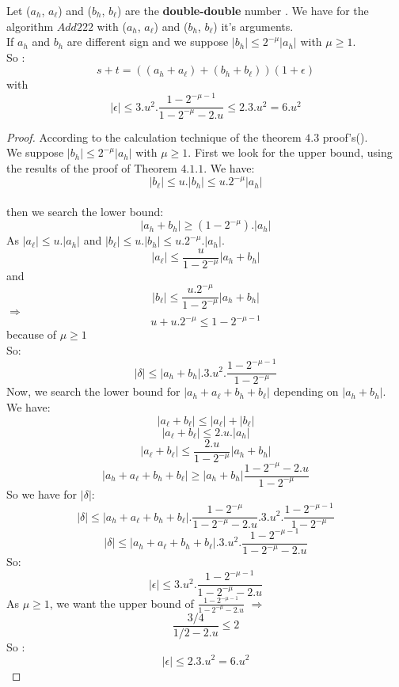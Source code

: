 \begin{theo}
Let ($a_h$, $a_{\ell}$) and ($b_h$, $b_{\ell}$) are the \textbf{double-double} number . We have for the algorithm $Add222$ with
($a_h$, $a_{\ell}$) and ($b_h$, $b_{\ell}$) it's arguments.\\
If $a_h$ and $b_h$ are different sign and we suppose $\lvert b_h \rvert \le 2^{-\mu} \lvert a_h \rvert $ with $\mu \ge 1$.\\
So :
$$ s+t = ((a_h+a_{\ell}) + (b_h + b_{\ell}))(1+\epsilon)$$
with $$\lvert \epsilon \rvert \le 3.u^2. \frac{1-2^{-\mu -1}}{1 - 2^{-\mu} - 2.u} \le 2.3.u^2 = 6.u^2$$
\end{theo}

\begin{proof} \color{-yellow}
According to the calculation technique of the theorem $4.3$ proof's(\cite{lauter2005basic}).\\
We suppose $\lvert b_h \rvert \le 2^{-\mu} \lvert a_h \rvert$ with $\mu \ge 1$.
First we look for the upper bound, using the results of the proof of Theorem $4.1.1$. We have:\\
$$\lvert b_{\ell} \rvert \le u.\lvert b_h \rvert \le u.2^{- \mu}\lvert a_h \rvert $$\\
then we search the lower bound:\\
$$\lvert a_h + b_h \rvert \ge (1 -2^{- \mu}).\lvert a_h\rvert$$
As $\lvert a_{\ell} \rvert \le u. \lvert a_h \rvert$ and $\lvert b_{\ell} \rvert \le u. \lvert b_h \rvert \le u.2^{-\mu}. \lvert a_h \rvert$.
$$\lvert a_{\ell}  \rvert \le \frac{u}{1- 2^{-\mu}}\lvert a_h + b_h\rvert$$
and 
$$\lvert b_{\ell}  \rvert \le \frac{u.2^{- \mu}}{1- 2^{-\mu}}\lvert a_h + b_h\rvert$$
$\Rightarrow$ 
$$u+u.2^{- \mu}\le 1 - 2^{-\mu -1}$$ because of $\mu \ge 1$\\
So:
$$ \lvert \delta \rvert \le \lvert a_h + b_h \rvert .3.u^2 .\frac{1 - 2^{-\mu -1}}{1 - 2^{-\mu}} $$
Now, we search the lower bound for $\lvert a_h +a_{\ell} + b_h +b_{\ell} \rvert $ depending on $\lvert a_h + b_h \rvert$.\\
We have:
$$\lvert a_{\ell} + b_{\ell} \rvert \le \lvert a_{\ell} \rvert + \lvert b_{\ell} \rvert$$
$$\lvert a_{\ell} + b_{\ell} \rvert \le 2.u.\lvert a_h \rvert$$
$$\lvert a_{\ell} + b_{\ell} \rvert \le \frac{2.u}{1 - 2^{-\mu}}\lvert a_h + b_h \rvert$$
$$\lvert a_h +a_{\ell} + b_h +b_{\ell} \rvert \ge  \lvert a_h + b_h \rvert \frac{1 - 2^{-\mu} -2.u}{1 - 2^{-\mu}}$$
So we have for $\lvert \delta \rvert $:
$$ \lvert \delta \rvert \le \lvert a_h + a_{\ell} + b_h + b_{\ell} \rvert. \frac{1 - 2^{-\mu}}{1 - 2^{-\mu} -2.u} .3.u^2 .\frac{1 - 2^{-\mu -1}}{1 - 2^{-\mu}} $$
$$ \lvert \delta \rvert \le \lvert a_h + a_{\ell} + b_h + b_{\ell} \rvert.  3.u^2 .\frac{1 - 2^{-\mu -1}}{1 - 2^{-\mu} - 2.u} $$
So:
$$\lvert \epsilon \rvert \le 3.u^2 .\frac{1 - 2^{-\mu -1}}{1 - 2^{-\mu} - 2.u}$$
As $\mu \ge 1$, we want the upper bound of $\frac{1 - 2^{-\mu -1}}{1 - 2^{-\mu} - 2.u}$ $\Rightarrow$
$$\frac{3/4}{1/2 -2.u} \le 2$$
So :
$$\lvert \epsilon \rvert \le 2.3.u^2 = 6.u^2$$
\end{proof}
